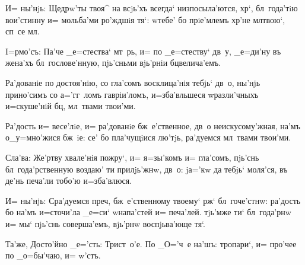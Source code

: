 И= ны'нjь: Щедрw'ты твоя^ на всjь'хъ всегда` 
низпосыла'ются, хр`, бл~года'тiю вои'стинну и= 
мольба'ми ро'ждшiя тя`: w\т тебе' бо прiе'млемъ 
хр'не мл твою`, сп~се мл.


I=рмо'съ: Па'че _е=стества` мт~рь, и= по _е=стеству` 
дв~у, _е=ди'ну въ жена'хъ бл~гослове'нную, пjь'сньми 
вjь'рнiи бц велича'емъ.

Ра'дованiе по достоя'нiю, со гла'сомъ восклица'нiя 
тебjь` дв~о, ны'нjь прино'симъ со а='гг~ломъ гаврiи'ломъ, 
и=зба'вльшеся w\т разли'чныхъ и=скуше'нiй бц, мл~твами 
твои'ми.

Ра'дость и= весе'лiе, и= ра'дованiе бж~е'ственное, 
дв~о неискусому'жная, на'мъ о_у=мно'жися бж~iе: се' бо 
пла'чущiися лю'тjь, ра'дуемся мл~твами твои'ми.

Сла'ва: Же'ртву хвале'нiя пожру`, и= я=зы'комъ и= 
гла'сомъ, пjь'снь бл~года'рственную воздаю' ти 
прилjь'жнw, дв~о: jа='кw да тебjь` моля'ся, въ де'нь 
печа'ли тобо'ю и=зба'влюся.

И= ны'нjь: Сра'дуемся преч, бж~е'ственному 
твоему` рж` бл~гоче'стнw: ра'дость бо на'мъ 
и=сточи'ла _е=си` w\т напа'стей и= печа'лей. тjь'мже ти` 
бл~года'рнw и= мы` пjь'снь соверша'емъ, вjь'рнw 
воспjьва'юще тя`.

Та'же, Досто'йно _е='сть: Трист~о'е. По _О='ч~е на'шъ: 
тропари`, и= про'чее по _о=бы'чаю, и= w'стъ.
